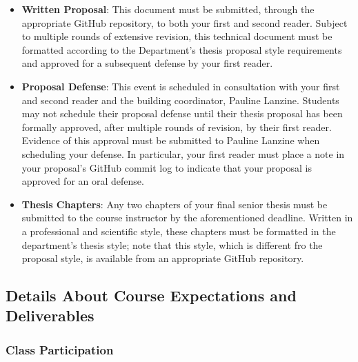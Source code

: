 \documentclass[11pt]{article}
\begin{document}
\begin{itemize}
  \item {\bf Written Proposal}: This document must be submitted, through the
    appropriate GitHub repository, to both your first and second reader. Subject
    to multiple rounds of extensive revision, this technical document must be
    formatted according to the Department's thesis proposal style requirements
    and approved for a subsequent defense by your first reader.

  \item {\bf Proposal Defense}: This event is scheduled in consultation with
    your first and second reader and the building coordinator, Pauline Lanzine.
    Students may not schedule their proposal defense until their thesis proposal
    has been formally approved, after multiple rounds of revision, by their
    first reader. Evidence of this approval must be submitted to Pauline Lanzine
    when scheduling your defense. In particular, your first reader must place a
    note in your proposal's GitHub commit log to indicate that your proposal is
    approved for an oral defense.

  \item {\bf Thesis Chapters}: Any two chapters of your final senior thesis must
    be submitted to the course instructor by the aforementioned deadline.
    Written in a professional and scientific style, these chapters must be
    formatted in the department's thesis style; note that this style, which is
    different fro the proposal style, is available from an appropriate GitHub
    repository.

\end{itemize}

\subsection*{Details About Course Expectations and Deliverables}

\subsubsection*{Class Participation}
\end{document}
